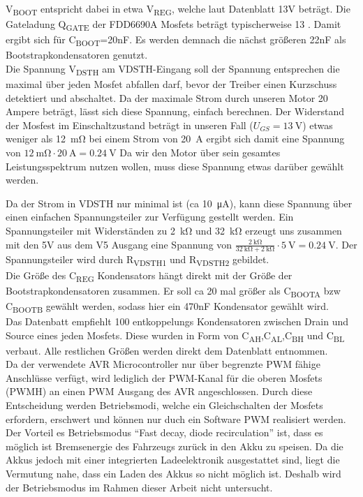 V\textsubscript{BOOT} entspricht dabei in etwa V\textsubscript{REG}, welche laut Datenblatt \cite{ds-A3941} 13V beträgt.
Die Gateladung Q\textsubscript{GATE} der FDD6690A Mosfets beträgt typischerweise \SI{13}{\nC} \cite{ds-fs}. Damit ergibt sich für C\textsubscript{BOOT}=20nF. Es werden demnach
die nächst größeren 22nF als Bootstrapkondensatoren genutzt.\\

Die Spannung V\textsubscript{DSTH} am VDSTH-Eingang soll der Spannung entsprechen die maximal über jeden Mosfet abfallen darf, bevor der Treiber einen Kurzschuss detektiert 
und abschaltet. Da der maximale Strom durch unseren Motor 20 Ampere beträgt, lässt sich diese Spannung, einfach berechnen. Der Widerstand der Mosfest im Einschaltzustand beträgt
in unseren Fall ($U_{GS}=\SI{13}{\V}$) etwas weniger als \SI{12}{\mohm}  bei einem Strom von \SI{20}{\A} ergibt sich damit eine Spannung von $\SI{12}{\mohm} \cdot \SI{20}{\A} = \SI{0,24}{\V}$
Da wir den Motor über sein gesamtes Leistungsspektrum nutzen wollen, muss diese Spannung etwas darüber gewählt werden.

Da der Strom in VDSTH nur minimal ist (ca \SI{10}{\uA}), kann diese Spannung über einen einfachen Spannungsteiler zur Verfügung gestellt werden. Ein Spannungsteiler mit 
Widerständen zu \SI{2}{\kohm} und \SI{32}{\kohm} erzeugt uns zusammen mit den 5V aus dem V5 Ausgang eine Spannung von $\frac{\SI{2}{\kohm}}{\SI{32}{\kohm}+\SI{2}{\kohm}}\cdot \SI{5}{\V} =\SI{0,24}{\V}$.
Der Spannungsteiler wird durch R\textsubscript{VDSTH1} und R\textsubscript{VDSTH2} gebildet.\\

Die Größe des C\textsubscript{REG} Kondensators hängt direkt mit der Größe der Bootstrapkondensatoren zusammen. Er soll ca 20 mal größer als
C\textsubscript{BOOTA} bzw C\textsubscript{BOOTB} gewählt werden, sodass hier ein 470nF Kondensator gewählt wird.\\

Das Datenbatt empfiehlt \SI{100}{\nF} entkoppelungs Kondensatoren zwischen Drain und Source eines jeden Mosfets. Diese wurden in Form von C\textsubscript{AH},C\textsubscript{AL},C\textsubscript{BH} und C\textsubscript{BL} 
verbaut. Alle restlichen Größen werden direkt dem Datenblatt entnommen.\\

Da der verwendete AVR Microcontroller nur über begrenzte PWM fähige Anschlüsse verfügt, wird lediglich der PWM-Kanal für die oberen Mosfets (PWMH) an einen PWM Ausgang des AVR angeschlossen.
Durch diese Entscheidung werden Betriebsmodi, welche ein Gleichschalten der Mosfets erfordern, erschwert und können nur duch ein Software PWM realisiert werden. Der Vorteil es Betriebsmodus ``Fast decay, diode recirculation''
ist, dass es möglich ist Bremsenergie des Fahrzeugs zurück in den Akku zu speisen. Da die Akkus jedoch mit einer integrierten Ladeelektronik ausgestattet sind, liegt die Vermutung nahe, dass ein Laden des Akkus so nicht möglich ist.
Deshalb wird der Betriebsmodus im Rahmen dieser Arbeit nicht untersucht.

